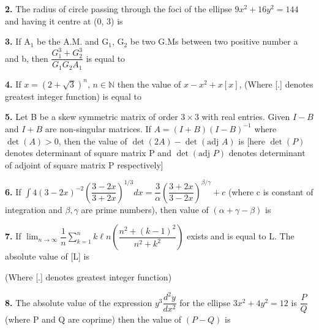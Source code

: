 \documentclass[10pt,twocolumn]{extarticle}
\begin{document}
\textbf{2.} The radius of circle passing through the foci of the ellipse $9x^2+16y^2=144$ and having it centre at (0, 3) is

\textbf{3.} If A$_1$ be the A.M. and G$_1$, G$_2$ be two G.Ms between two positive number a and b, then $\dfrac{G_1^3+G_2^3}{G_1G_2A_1}$ is equal to

\textbf{4.} If $x=(2+\sqrt3)^n$, $n\in\mathbb{N}$ then the value of $x-x^2+x[x]$, (Where [.] denotes greatest integer function) is equal to

\textbf{5.} Let B be a skew symmetric matrix of order $3\times3$ with real entries.
Given $I-B$ and $I+B$ are non-singular matrices.
If $A=(I+B)(I-B)^{-1}$ where $\det(A)>0$, then the value of $\det(2A)-\det(\text{adj }A)$ is
[here $\det(P)$ denotes determinant of square matrix P and $\det(\text{adj }P)$ denotes determinant of adjoint of square matrix P respectively]

\textbf{6.} If $\displaystyle\int4(3-2x)^{-2}\left(\dfrac{3-2x}{3+2x}\right)^{1/3}dx=\dfrac3\alpha\left(\dfrac{3+2x}{3-2x}\right)^{\beta/\gamma}+c$ (where c is constant of integration and $\beta,\gamma$ are prime numbers), then value of $(\alpha+\gamma-\beta)$ is

\textbf{7.} If $\displaystyle\lim_{n\to\infty}\dfrac1n\sum_{k=1}^n k\ell n\left(\dfrac{n^2+(k-1)^2}{n^2+k^2}\right)$ exists and is equal to L. The absolute value of [L] is

(Where [.] denotes greatest integer function)

\textbf{8.} The absolute value of the expression $y^3\dfrac{d^2y}{dx^2}$ for the ellipse $3x^2+4y^2=12$ is $\dfrac PQ$ (where P and Q are coprime) then the value of $(P-Q)$ is
\end{document}

